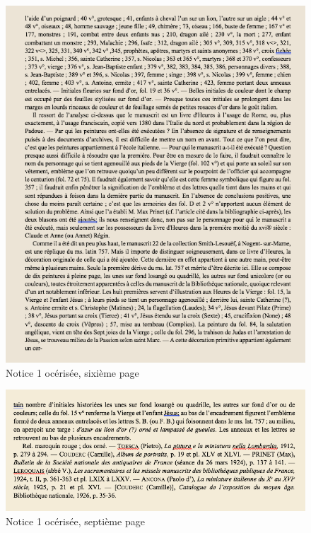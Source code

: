 \documentclass[a4paper,12pt,twoside]{book}
\begin{document}
    \begin{figure}[!h]
    \centering
    \includegraphics[width=15cm]{img/Notices_Leroquais/Notice1/OCR/notice_OCR_1_6.png}
    \caption{Notice 1 océrisée, sixième page}
    \end{figure}
    \clearpage
    
    \begin{figure}[!h]
    \centering
    \includegraphics[width=15cm]{img/Notices_Leroquais/Notice1/OCR/notice_OCR_1_7.jpeg}
    \caption{Notice 1 océrisée, septième page}
    \end{figure}
    \clearpage
    
\end{document}
